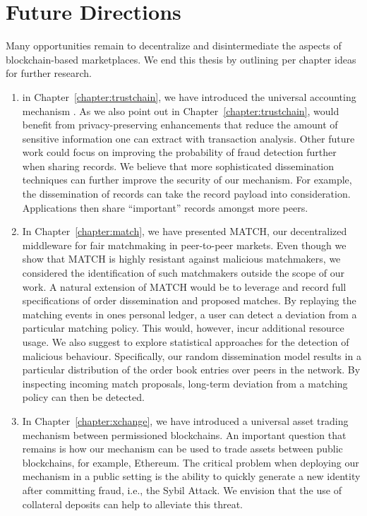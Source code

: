 \section{Future Directions}
Many opportunities remain to decentralize and disintermediate the aspects of blockchain-based marketplaces.
We end this thesis by outlining per chapter ideas for further research.

\begin{enumerate}
	\item in Chapter~\ref{chapter:trustchain}, we have introduced the universal accounting mechanism \TrustChain{}.
	As we also point out in Chapter~\ref{chapter:trustchain}, \TrustChain{} would benefit from privacy-preserving enhancements that reduce the amount of sensitive information one can extract with transaction analysis.
	Other future work could focus on improving the probability of fraud detection further when sharing records.
	We believe that more sophisticated dissemination techniques can further improve the security of our mechanism.
	For example, the dissemination of records can take the record payload into consideration.
	Applications then share \enquote{important} records amongst more peers.
	
	\item In Chapter~\ref{chapter:match}, we have presented MATCH, our decentralized middleware for fair matchmaking in peer-to-peer markets.
	Even though we show that MATCH is highly resistant against malicious matchmakers, we considered the identification of such matchmakers outside the scope of our work.
	A natural extension of MATCH would be to leverage \TrustChain{} and record full specifications of order dissemination and proposed matches.
	By replaying the matching events in ones personal ledger, a user can detect a deviation from a particular matching policy.
	This would, however, incur additional resource usage.
	We also suggest to explore statistical approaches for the detection of malicious behaviour.
	Specifically, our random dissemination model results in a particular distribution of the order book entries over peers in the network.
	By inspecting incoming match proposals, long-term deviation from a matching policy can then be detected.
	
	\item In Chapter~\ref{chapter:xchange}, we have introduced a universal asset trading mechanism between permissioned blockchains.
	An important question that remains is how our mechanism can be used to trade assets between public blockchains, for example, Ethereum.
	The critical problem when deploying our mechanism in a public setting is the ability to quickly generate a new identity after committing fraud, i.e., the Sybil Attack.
	We envision that the use of collateral deposits can help to alleviate this threat.
	

\end{enumerate}
